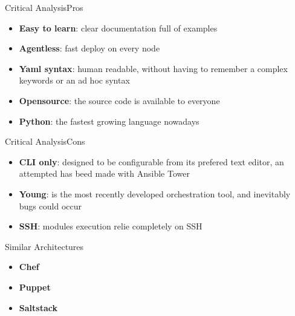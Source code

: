 \documentclass[10pt]{beamer}
\begin{document}
\begin{frame}[fragile]{Critical Analysis}{Pros}
\begin{itemize}
    \item \textbf{Easy to learn}: clear documentation full of examples
    \item \textbf{Agentless}: fast deploy on every node
    \item \textbf{Yaml syntax}: human readable, without having to remember a complex keywords or an ad hoc syntax
    \item \textbf{Opensource}: the source code is available to everyone
     \item \textbf{Python}: the fastest growing language nowadays
\end{itemize}
\end{frame}



\begin{frame}[fragile]{Critical Analysis}{Cons}
\begin{itemize}
    \item \textbf{CLI only}: designed to be configurable from its prefered text editor, an attempted has beed made with Ansible Tower
    \item \textbf{Young}: is the most recently developed orchestration tool, and inevitably bugs could occur
    \item \textbf{SSH}: modules execution relie completely on SSH 
\end{itemize}
\end{frame}


\begin{frame}[fragile]{Similar Architectures}
\begin{itemize}
    \item \textbf{Chef}
    \item \textbf{Puppet}
    \item \textbf{Saltstack}
\end{itemize}
\end{frame}
\end{document}
